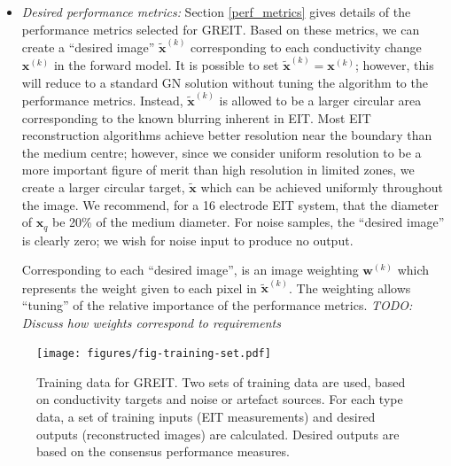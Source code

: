 \documentclass[12pt]{iopart}
\newcommand{\xB}{\mbox{$\mathbf{x}$}}
\newcommand{\xH}{\mbox{$\mathbf{\hat x}$}}
\newcommand{\xT}{\mbox{$\mathbf{\tilde x}$}}
\newcommand{\wB}{\mbox{$\mathbf{w}$}}
\begin{document}
\begin{itemize}
\hspace{5mm}
{\em Electrode movement artefacts}
occur when the electrodes move, either with posture change
or with chest movements due to breathing. Several reports
have demonstrated the serious impact of such movements on
EIT images (Adler et al, 1996, Patterson et al, 2005,
Coulombe et al 2005). In order to reduce the impact
of such movement on EIT reconstruction, Soleimani et al
(2006) showed that it is possible to create an
augmented forward model based on both the conductivity change
and electrode movement, which resulted in reduced movement 
artefacts in the reconstructed images. In order
to use this capability in GREIT, we specify that a
set of ``noise'' measurements due to electrode movement 
be incorporated. This is currently implemented from
deformations of the FEM (G\'omez-Laberge and Adler, 2008),
but may be based on a calibration protocol in an
implemented system.

 
\item
{\em Desired performance metrics:}
Section \ref{perf_metrics} gives details of the 
performance metrics selected for GREIT. Based on these
metrics, we can create a ``desired image''
$\xT^{(k)}$ corresponding to each conductivity change
$\xB^{(k)}$ in the forward model. It is possible to set
$\xT^{(k)} = \xB^{(k)}$; however, this will reduce to a standard
GN solution without tuning the algorithm to the 
performance metrics. Instead, $\xT^{(k)}$ is allowed to be
a larger circular area corresponding to the known
blurring inherent in EIT. Most EIT reconstruction algorithms
achieve better resolution near the boundary than the medium
centre; however, since we consider uniform resolution to
be a more important figure of merit than high resolution
in limited zones, we create a larger circular target, $\xT$
which can be achieved uniformly throughout the image.
We recommend, for a 16 electrode
EIT system, that the diameter of $\xH_q$
be 20\% of the medium diameter.
For noise samples, the ``desired image'' is clearly
zero; we wish for noise input to produce no output.

Corresponding to each ``desired image'', is an image
weighting $\wB^{(k)}$ which represents the weight given to 
each pixel in $\xT^{(k)}$. The weighting allows ``tuning''
of the relative importance of the  performance metrics.
{\em
TODO: Discuss how weights correspond to requirements
}
\end{itemize}

\begin{figure}[bhtp]
\begin{center}
\texttt{[image: figures/fig-training-set.pdf]}
\caption{ \label{fig:desired_performance}
Training data for GREIT. Two sets of training data are used, based on
conductivity targets and noise or artefact sources. For each type
data, a set of training inputs (EIT measurements) and desired
outputs (reconstructed images) are calculated. Desired outputs
are based on the consensus performance measures.
}
\end{center}
\end{figure}
\end{document}
